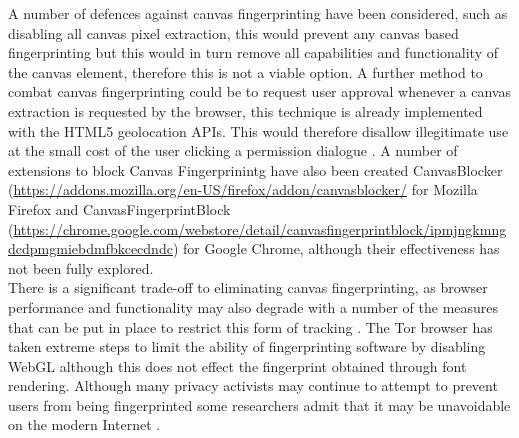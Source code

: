 \documentclass[12pt]{article}
\begin{document}
A number of defences against canvas fingerprinting have been considered, such as disabling all canvas pixel extraction, this would prevent any canvas based fingerprinting but this would in turn remove all capabilities and functionality of the canvas element, therefore this is not a viable option. A further method to combat canvas fingerprinting could be to request user approval whenever a canvas extraction is requested by the browser, this technique is already implemented with the HTML5 geolocation APIs. This would therefore disallow illegitimate use at the small cost of the user clicking a permission dialogue \parencite{canvasFP}. A number of extensions to block Canvas Fingerprinintg have also been created CanvasBlocker (\url{https://addons.mozilla.org/en-US/firefox/addon/canvasblocker/} for Mozilla Firefox and CanvasFingerprintBlock (\url{https://chrome.google.com/webstore/detail/canvasfingerprintblock/ipmjngkmngdcdpmgmiebdmfbkcecdndc}) for Google Chrome, although their effectiveness has not been fully explored. \\  

There is a significant trade-off to eliminating canvas fingerprinting, as browser performance and functionality may also degrade with a number of the measures that can be put in place to restrict this form of tracking \parencite{canvasFP}. The Tor browser has taken extreme steps to limit the ability of fingerprinting software by disabling WebGL although this does not effect the fingerprint obtained through font rendering. Although many privacy activists may continue to attempt to prevent users from being fingerprinted some researchers admit that it may be unavoidable on the modern Internet \parencite{canvasFP}.

\end{document}
